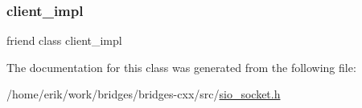 \subsubsection{\texorpdfstring{client\+\_\+impl}{client\_impl}}
{\footnotesize\ttfamily friend class client\+\_\+impl\hspace{0.3cm}{\ttfamily [friend]}}



The documentation for this class was generated from the following file\+:\begin{DoxyCompactItemize}
\item 
/home/erik/work/bridges/bridges-\/cxx/src/\hyperlink{sio__socket_8h}{sio\+\_\+socket.\+h}\end{DoxyCompactItemize}
